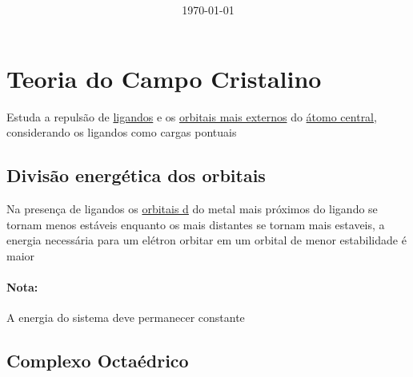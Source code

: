 \documentclass[12pt]{article}
\title{\bfseries\color{Emph}\mytitle}
\author{\myauthor}
\date{\today}
\begin{document}
\section{Teoria do Campo Cristalino}
\label{campo cristalino}
%
Estuda a \textcolor{EmphLight}{repulsão} de 
\hyperref[ligando]{ligandos} e os 
\hyperref[oa d]{orbitais mais externos} do 
\hyperref[elemento central]{átomo central}, 
considerando os ligandos como 
\textcolor{EmphLight}{cargas pontuais}
%

\subsection{Divisão energética dos orbitais}

%
Na presença de ligandos os \hyperref[oa d]{orbitais d} 
do metal mais próximos do ligando se tornam 
\textcolor{EmphLight}{menos estáveis} enquanto os mais 
distantes se tornam \textcolor{EmphLight}{mais estaveis}, 
a energia necessária para um elétron orbitar em um orbital 
de menor estabilidade é maior
%
\paragraph{Nota:} A energia do sistema deve permanecer 
constante
%

\subsection*{Complexo Octaédrico}
\end{document}

